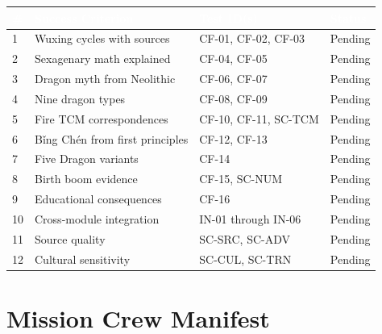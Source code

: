 \documentclass[11pt,letterpaper]{article}
\newcommand{\tableheader}[1]{\textbf{\sffamily\textcolor{white}{#1}}}
\begin{document}
\begin{center}
\begin{tabularx}{\textwidth}{C{0.5cm}XL{3cm}C{1.5cm}}
\toprule
{}
\tableheader{\#} & \tableheader{Success Criterion} & \tableheader{Test ID(s)} & \tableheader{Status} \\
 & Wuxing cycles with sources & CF-01, CF-02, CF-03 & Pending \\
2 & Sexagenary math explained & CF-04, CF-05 & Pending \\
3 & Dragon myth from Neolithic & CF-06, CF-07 & Pending \\
4 & Nine dragon types & CF-08, CF-09 & Pending \\
5 & Fire TCM correspondences & CF-10, CF-11, SC-TCM & Pending \\
6 & Bǐng Chén from first principles & CF-12, CF-13 & Pending \\
7 & Five Dragon variants & CF-14 & Pending \\
8 & Birth boom evidence & CF-15, SC-NUM & Pending \\
9 & Educational consequences & CF-16 & Pending \\
10 & Cross-module integration & IN-01 through IN-06 & Pending \\
11 & Source quality & SC-SRC, SC-ADV & Pending \\
12 & Cultural sensitivity & SC-CUL, SC-TRN & Pending \\
\bottomrule
\end{tabularx}
\end{center}

\section{Mission Crew Manifest}
\end{document}
